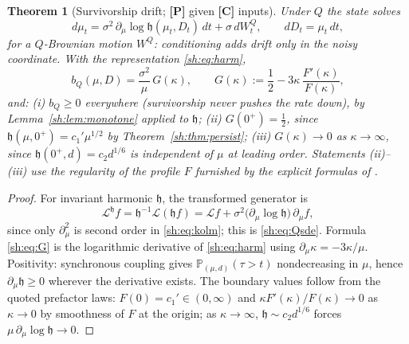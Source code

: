 \documentclass[11pt]{article}
\numberwithin{equation}{section}
\theoremstyle{plain}
\newtheorem{theorem}{Theorem}[section]
\theoremstyle{definition}
\theoremstyle{remark}
\newcommand{\PP}{\mathbb{P}}
\newcommand{\Lc}{\mathcal{L}}
\newcommand{\hm}{\mathfrak{h}}
\begin{document}
\begin{theorem}[Survivorship drift; \textbf{[P]} given \textbf{[C]} inputs]
\label{sh:thm:drift}
Under $Q$ the state solves
\begin{equation}\label{sh:eq:Qsde}
d\mu_t=\sigma^2\,\partial_\mu\log\hm(\mu_t,D_t)\,dt+\sigma\,dW^Q_t,
\qquad dD_t=\mu_t\,dt,
\end{equation}
for a $Q$-Brownian motion $W^Q$: conditioning adds drift only in the
noisy coordinate. With the representation \eqref{sh:eq:harm},
\begin{equation}\label{sh:eq:G}
b_Q(\mu,D)=\frac{\sigma^2}{\mu}\,G(\kappa),
\qquad
G(\kappa):=\frac12-3\kappa\,\frac{F'(\kappa)}{F(\kappa)},
\end{equation}
and: \emph{(i)} $b_Q\ge0$ everywhere (survivorship never pushes the rate
down), by Lemma~\ref{sh:lem:monotone} applied to $\hm$;
\emph{(ii)} $G(0^+)=\tfrac12$, since
$\hm(\mu,0^+)=c_1'\mu^{1/2}$ by Theorem~\ref{sh:thm:persist};
\emph{(iii)} $G(\kappa)\to0$ as $\kappa\to\infty$, since
$\hm(0^+,d)=c_2 d^{1/6}$ is independent of $\mu$ at leading order.
Statements (ii)--(iii) use the regularity of the profile $F$ furnished by
the explicit formulas of \cite{GJW99}.
\end{theorem}

\begin{proof}
For invariant harmonic $\hm$, the transformed generator is
\[
\Lc^{\hm}f=\hm^{-1}\Lc(\hm f)
=\Lc f+\sigma^2\bigl(\partial_\mu\log\hm\bigr)\,\partial_\mu f,
\]
since only $\partial_\mu^2$ is second order in
\eqref{sh:eq:kolm}; this is \eqref{sh:eq:Qsde}. Formula \eqref{sh:eq:G}
is the logarithmic derivative of \eqref{sh:eq:harm} using
$\partial_\mu\kappa=-3\kappa/\mu$. Positivity: synchronous coupling gives
$\PP_{(\mu,d)}(\tau>t)$ nondecreasing in $\mu$, hence
$\partial_\mu\hm\ge0$ wherever the derivative exists. The boundary values
follow from the quoted prefactor laws: $F(0)=c_1'\in(0,\infty)$ and
$\kappa F'(\kappa)/F(\kappa)\to0$ as $\kappa\to0$ by smoothness of $F$ at
the origin; as $\kappa\to\infty$, $\hm\sim c_2d^{1/6}$ forces
$\mu\,\partial_\mu\log\hm\to0$.
\end{proof}
\end{document}
